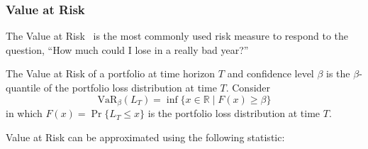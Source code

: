 \documentclass[11pt,fleqn]{book} %
\begin{document}
\subsubsection{Value at Risk}

The Value at Risk~\cite{var:jorion} is the most commonly used risk measure 
to respond to the question, ``How much could I lose in a really bad year?''

\begin{definition}
	The Value at Risk of a portfolio at time horizon $T$ and confidence level 
	$\beta$ is the $\beta$-quantile of the portfolio loss distribution at time 
	$T$. Consider
	\begin{displaymath}
		\text{VaR}_\beta(L_T) = \inf\{x \in \mathbb{R} \mid F(x) \ge \beta \}
	\end{displaymath}
	in which $F(x)=\Pr\{L_T \le x\}$ is the portfolio loss distribution at 
	time $T$.
\end{definition}

Value at Risk can be approximated using the following statistic:
\end{document}
